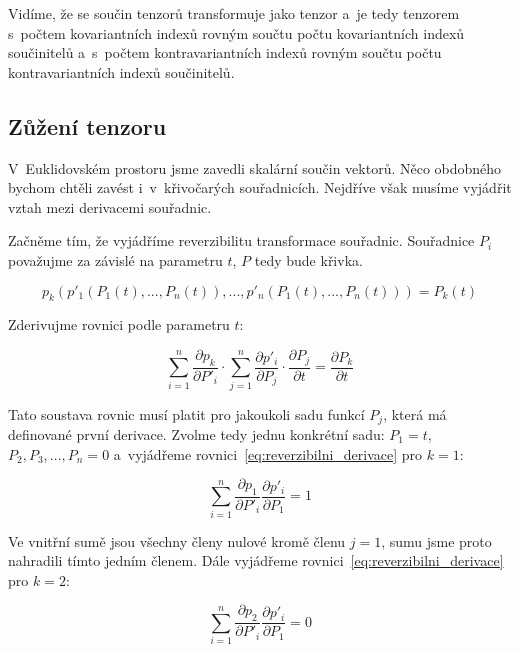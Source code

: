 \documentclass{book}
\begin{document}
Vidíme, že se součin tenzorů transformuje jako tenzor a~je tedy tenzorem s~počtem kovariantních indexů rovným součtu počtu kovariantních indexů součinitelů a~s~počtem kontravariantních indexů rovným součtu počtu kontravariantních indexů součinitelů. 

\subsection{Zůžení tenzoru}

V~Euklidovském prostoru jsme zavedli skalární součin vektorů. Něco obdobného bychom chtěli zavést i~v~křivočarých souřadnicích. Nejdříve však musíme vyjádřit vztah mezi derivacemi souřadnic.

Začněme tím, že vyjádříme reverzibilitu transformace souřadnic. Souřadnice \(P_i\) považujme za závislé na parametru \(t\), \(P\) tedy bude křivka.

\begin{equation}
p_k(p'_1(P_1(t), ..., P_n(t)), ..., p'_n(P_1(t), ..., P_n(t))) = P_k(t)
\end{equation}

Zderivujme rovnici podle parametru \(t\):

\begin{equation}
\label{eq:reverzibilni_derivace}
\sum_{i=1}^n \frac{\partial p_k}{\partial P'_i} \cdot \sum_{j=1}^n \frac{\partial p'_i}{\partial P_j} \cdot \frac{\partial P_j}{\partial t} = \frac{\partial P_k}{\partial t}
\end{equation}

Tato soustava rovnic musí platit pro jakoukoli sadu funkcí \(P_j\), která má definované první derivace. Zvolme tedy jednu konkrétní sadu: \(P_1 = t\), \(P_2, P_3, ..., P_n = 0\) a~vyjádřeme rovnici~\eqref{eq:reverzibilni_derivace} pro \(k = 1\):

\begin{equation}
\sum_{i=1}^n \frac{\partial p_1}{\partial P'_i} \frac{\partial p'_i}{\partial P_1} = 1
\end{equation}

Ve vnitřní sumě jsou všechny členy nulové kromě členu \(j = 1\), sumu jsme proto nahradili tímto jedním členem.
Dále vyjádřeme rovnici~\eqref{eq:reverzibilni_derivace} pro \(k = 2\):

\begin{equation}
\sum_{i=1}^n \frac{\partial p_2}{\partial P'_i} \frac{\partial p'_i}{\partial P_1} = 0
\end{equation}
\end{document}
